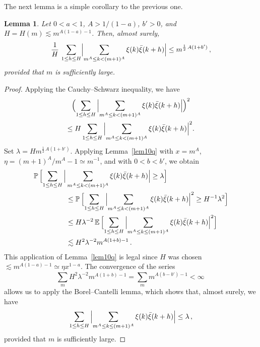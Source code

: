 \documentclass[11pt]{amsart}
\numberwithin{equation}{section}
\newtheorem{lemma}{Lemma}[section]
\begin{document}
The next lemma is a simple corollary to the previous one.

\begin{lemma}\label{lem10q'}
Let $0<a<1$, $A>1/(1-a)$, $b'>0$, and $H=H(m)\lesssim m^{A(1-a)-1}$.
Then, almost surely,
\[
\frac1H\, \sum_{1\le h  \le H}
\Bigl|\sum_{m^A\le k < (m+1)^A}\xi(k)\bar\xi(k+h)\Bigr| \le
m^{\frac12\, A(1+b')}\,,
\]
provided that $m$ is sufficiently large.
\end{lemma}

\begin{proof}
Applying the Cauchy--Schwarz inequality, we have
\begin{multline*}
\Bigl(\sum_{1\le h\le H}\, \Bigl|\sum_{m^A\le k < (m+1)^A}\xi(k)\bar\xi(k+h)\Bigr|\Bigr)^2 
\\ \le
H \sum_{ 1 \le h\le H}\, \Bigl|\sum_{m^A\le k < (m+1)^A}\xi(k)\bar\xi(k+h)\Bigr|^2.
\end{multline*}
Set $\lambda = H m^{\frac12\, A(1+b')}$.
Applying Lemma~\ref{lem10q} with $x=m^A$, $\eta = (m+1)^A/m^A -1 \simeq m^{-1}$, and with
$0<b<b'$, we obtain
\begin{align*}
\mathbb P\,\Bigl[
\sum_{1\le h \le H}\,
\Bigl| &\sum_{m^A\le k < (m+1)^A}\xi(k)\bar\xi(k+h)\Bigr| \ge \lambda \Bigr] \\
&\le
\mathbb P\,\Bigl[
\sum_{1\le h \le H}\,
\Bigl| \sum_{m^A\le k < (m+1)^A}\xi(k)\bar\xi(k+h)\Bigr|^2 \ge H^{-1} \lambda^2 \Bigr]
\\
&\le H \lambda^{-2} \,
\mathbb E\,\Bigl[\sum_{1 \le h\le H}\,
\Bigl|\sum_{m^A\le k\le (m+1)^A}\xi(k)\bar\xi(k+h)\Bigr|^2\Bigr] \\
&\lesssim H^2\lambda^{-2}m^{A(1+b)-1}\,.
\end{align*}
This application of Lemma~\ref{lem10q} is legal since
$H$ was chosen $\lesssim m^{A(1-a)-1} \simeq \eta x^{1-a}$.
The convergence of the series
\[
\sum_m H^2\lambda^{-2}m^{A(1+b)-1}  = \sum_m m^{ A(b-b')-1} < \infty\,
\]
allows us to apply the Borel--Cantelli lemma, which shows that, almost surely,
we have
\[
\sum_{1\le h\le H}\, \Bigl|\sum_{m^A\le k\le (m+1)^A}\xi(k)\bar\xi(k+h)\Bigr|
\le \lambda\,,
\]
provided that $m$ is sufficiently large. \end{proof}
\end{document}
